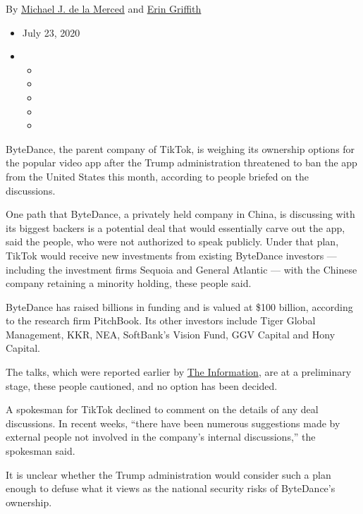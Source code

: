 By \href{https://www.nytimes.com/by/michael-j-de-la-merced}{Michael J.
de la Merced} and \href{https://www.nytimes.com/by/erin-griffith}{Erin
Griffith}

\begin{itemize}
\item
  July 23, 2020
\item
  \begin{itemize}
  \item
  \item
  \item
  \item
  \item
  \end{itemize}
\end{itemize}

ByteDance, the parent company of TikTok, is weighing its ownership
options for the popular video app after the Trump administration
threatened to ban the app from the United States this month, according
to people briefed on the discussions.

One path that ByteDance, a privately held company in China, is
discussing with its biggest backers is a potential deal that would
essentially carve out the app, said the people, who were not authorized
to speak publicly. Under that plan, TikTok would receive new investments
from existing ByteDance investors --- including the investment firms
Sequoia and General Atlantic --- with the Chinese company retaining a
minority holding, these people said.

ByteDance has raised billions in funding and is valued at \$100 billion,
according to the research firm PitchBook. Its other investors include
Tiger Global Management, KKR, NEA, SoftBank's Vision Fund, GGV Capital
and Hony Capital.

The talks, which were reported earlier by
\href{https://www.theinformation.com/articles/bytedance-investors-discuss-tiktok-purchase}{The
Information}, are at a preliminary stage, these people cautioned, and no
option has been decided.

A spokesman for TikTok declined to comment on the details of any deal
discussions. In recent weeks, ``there have been numerous suggestions
made by external people not involved in the company's internal
discussions,'' the spokesman said.

It is unclear whether the Trump administration would consider such a
plan enough to defuse what it views as the national security risks of
ByteDance's ownership.

